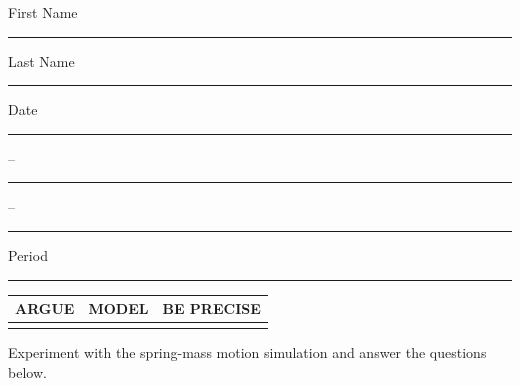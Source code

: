 \documentclass[twoside, 10pt]{article}
\title{}
\date{}
\begin{document}
\noindent
{\large
First Name \rule{8em}{.1pt} Last Name \rule{8em}{.1pt} Date \rule{1.5em}{.1pt} -- \rule{1.5em}{.1pt} -- \rule{1.5em}{.1pt} Period \rule{2em}{.1pt} 
}
\vspace{1em}

\noindent
\renewcommand{\arraystretch}{2}
\begin{tabular}{|l|l|l|}
\hline
\textbf{ARGUE}&\textbf{MODEL}&\textbf{BE PRECISE}\\
\hline
&&\\
\hline
\end{tabular}
\vspace{2em}

Experiment with the spring-mass motion simulation and answer the questions below.
\end{document}
